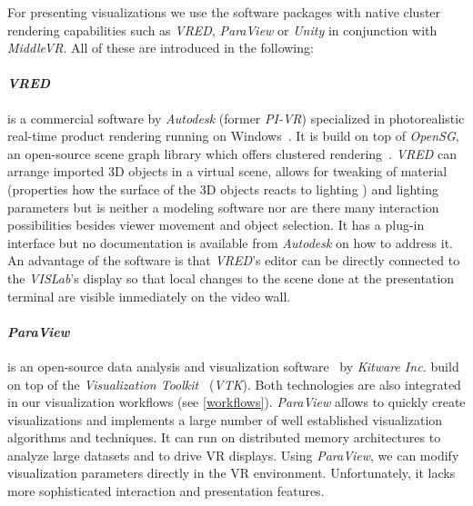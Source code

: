 \documentclass[twocolumn]{svjour3}          %
\begin{document}
For presenting visualizations we use the software packages with native cluster rendering capabilities such as \emph{VRED}, \emph{ParaView} or \emph{Unity} in conjunction with \emph{MiddleVR}. All of these are introduced in the following:

\paragraph{\emph{VRED}}
is a commercial software by \emph{Autodesk} (former \emph{PI-VR}) specialized in photorealistic real-time product rendering running on Windows~\cite{web:vred}. It is build on top of \emph{OpenSG}, an open-source scene graph library which offers clustered rendering~\cite{opensg}. \emph{VRED} can arrange imported 3D objects in a virtual scene, allows for tweaking of material (properties how the surface of the 3D objects reacts to lighting ) and lighting parameters but is neither a modeling software nor are there many interaction possibilities besides viewer movement and object selection. It has a plug-in interface but no documentation is available from \emph{Autodesk} on how to address it. An advantage of the software is that \emph{VRED}'s editor can be directly connected to the \emph{VISLab}'s display so that local changes to the scene done at the presentation terminal are visible immediately on the video wall.

\paragraph{\emph{ParaView}}
is an open-source data analysis and visualization software~\cite{paraview} by \emph{Kitware Inc.} build on top of the \emph{Visualization Toolkit}~\cite{vtk} (\emph{VTK}). Both technologies are also integrated in our visualization workflows (see \ref{workflows}). \emph{ParaView} allows to quickly create visualizations and implements a large number of well established visualization algorithms and techniques. It can run on distributed memory architectures to analyze large datasets and to drive VR displays. Using \emph{ParaView}, we can modify visualization parameters directly in the VR environment. Unfortunately, it lacks more sophisticated interaction and presentation features.
\end{document}

